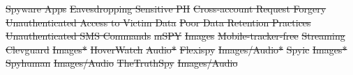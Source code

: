 \documentclass[sigconf,balance=false]{acmart}
\newcommand{\ltgrey}{\rowcolor[gray]{0.88}} %
\newcommand{\sumanth}[1]{\textcolor{violet}{\noindent[SR: #1]}}
\newcommand{\sumanth}[1]{}
\newcommand{\rating}[1]{%
	\begin{tikzpicture}[x=1ex,y=1ex]
		\begin{scope}
			\clip (0,1) circle (1);
			\fill[lightgray] (-1,0) rectangle (1,#1/50);
		\end{scope}
		\draw[black, thin, radius=1] (0,1) circle;
	\end{tikzpicture}%
}
\providecommand{\DIFdel}[1]{{\protect\color{red}\sout{#1}}}                      %
\providecommand{\DIFdelFL}[1]{\DIFdel{#1}} %
\begin{document}


		\DIFdelFL{Spyware Apps }%
\DIFdelFL{Eavesdropping Sensitive PII }%
\DIFdelFL{Cross-account Request Forgery }%
\DIFdelFL{Unauthenticated Access to Victim Data }%
\DIFdelFL{Poor Data Retention Practices }%
\DIFdelFL{Unauthenticated SMS Commands }%
\DIFdelFL{mSPY }%
\DIFdelFL{Images }%
\DIFdelFL{Mobile-tracker-free }%
\DIFdelFL{Streaming }%
\DIFdelFL{Clevguard }%
\DIFdelFL{Images* }%
\DIFdelFL{HoverWatch }%
\DIFdelFL{Audio* }%
\DIFdelFL{Flexispy }%
\DIFdelFL{Images/Audio* }%
\DIFdelFL{Spyic }%
\DIFdelFL{Images* }%
\DIFdelFL{Spyhuman }%
\DIFdelFL{Images/Audio }%
\DIFdelFL{TheTruthSpy }%
\DIFdelFL{Images/Audio }%
\end{document}
